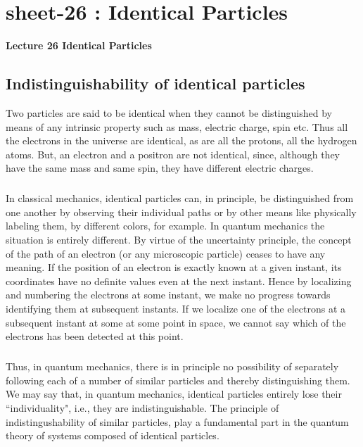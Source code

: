 \chapter{sheet-26 : Identical Particles}

\ifpdf
\graphicspath{{Chapter26/figs/}}
\else
\graphicspath{{Chapter26/figs/}}
\fi



\setcounter{chapter}{26}


\begin{Large}
	\noindent
	{\bf Lecture 26 \newline
		Identical Particles}
\end{Large}
\vspace{1 cm}

\section{Indistinguishability of identical particles}
Two particles are said to be identical when they cannot be distinguished by means of any intrinsic property such as mass, electric
charge, spin etc. Thus all the electrons in the universe are identical, as are all the protons, all the hydrogen atoms. But,
an electron and a positron are not identical, since, although they have the same mass and same spin, they have different
electric charges.

\paragraph{}
In classical mechanics, identical particles can, in principle, be distinguished from one another by observing their individual paths or by 
other means like physically labeling them, by different colors, for example. In quantum mechanics the situation is entirely different. By
virtue of the uncertainty principle, the concept of the path of an electron (or any microscopic particle) ceases to have any
meaning. If the position of an electron is exactly known at a given instant, its coordinates have no definite values even at the
next instant. Hence by localizing and numbering the electrons at some instant, we make no progress towards identifying them at subsequent instants. If we localize one of the electrons at a subsequent instant at some at some point in space, we cannot say which of the electrons has been detected at this point.

\paragraph{}
Thus, in quantum mechanics, there is in principle no possibility of separately following each of a number of similar particles and thereby distinguishing them. We may say that, in quantum mechanics, identical particles entirely lose their ``individuality", i.e., they are
indistinguishable. The principle of indistingushability of similar particles, play a fundamental part in the quantum theory of systems composed of identical particles.  

